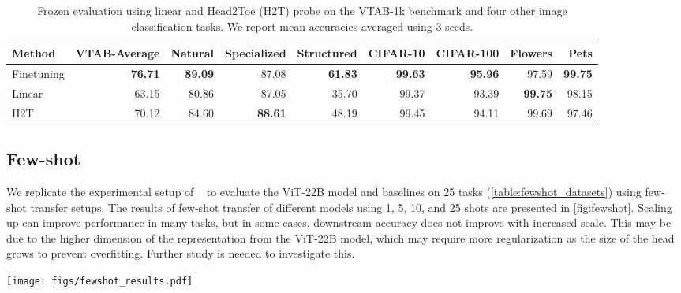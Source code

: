 \documentclass{article}
\newcommand{\chonk}{\mbox{ViT-22B}\xspace}
\begin{document}
\begin{table}[htbp]
    \centering
    \caption{Frozen evaluation using linear and Head2Toe (H2T) probe on the VTAB-1k benchmark and four other image classification tasks. We report mean accuracies averaged using 3 seeds.}
    \label{tab:h2t_vtab}
\begin{tabular}{@{}lrrrrrrrr@{}}
    \toprule
    Method &  VTAB-Average &  Natural & Specialized &  Structured &  CIFAR-10 & CIFAR-100 &   Flowers  &      Pets   \\
    \midrule
    Finetuning   & \textbf{76.71} &  \textbf{89.09} & 87.08 & \textbf{61.83} & \textbf{99.63} &    \textbf{95.96} & 97.59  &  \textbf{99.75}\\
    Linear   & 63.15 &  80.86 & 87.05 & 35.70 &  99.37 &    93.39 &  \textbf{99.75} &  98.15 \\
    H2T & 70.12 &  84.60 & \textbf{88.61} & 48.19 &  99.45 &  94.11 &  99.69 &  97.46 \\
    \bottomrule
    \end{tabular}


\end{table}


\subsection{Few-shot}
We replicate the experimental setup of ~\citep{abnar2021exploring} to evaluate the \chonk model and baselines on 25 tasks (\cref{table:fewshot_datasets}) using few-shot transfer setups. The results of few-shot transfer of different models using 1, 5, 10, and 25 shots are presented in \cref{fig:fewshot}. 
Scaling up can improve performance in many tasks, but in some cases, downstream accuracy does not improve with increased scale. This may be due to the higher dimension of the representation from the \chonk model, which may require more regularization as the size of the head grows to prevent overfitting. Further study is needed to investigate this. 

\begin{figure*}[h]
    \centering
    \texttt{[image: figs/fewshot\_results.pdf]}
    \vspace{-10pt}
    \caption{Few-shot transfer with 1, 5, 10, and 25 shots on 25 vision tasks~\citep{abnar2021exploring}.}
    \vspace{-15pt}
    \label{fig:fewshot}
\end{figure*}
\end{document}

